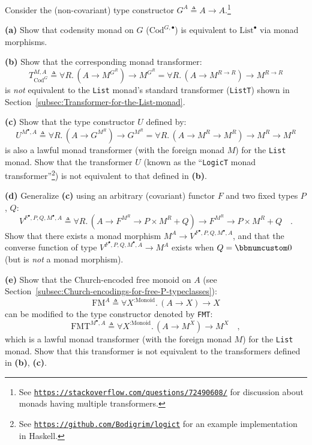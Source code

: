Consider the (non-covariant) type constructor $G^{A}\triangleq A\rightarrow A$.\footnote{See \texttt{\href{https://stackoverflow.com/questions/72490608/}{https://stackoverflow.com/questions/72490608/}}
for discussion about monads having multiple transformers.}

\textbf{(a)} Show that codensity monad on $G$ ($\text{Cod}^{G,\bullet}$)
is equivalent to $\text{List}^{\bullet}$ via monad morphisms.

\textbf{(b)} Show that the corresponding monad transformer: 
\[
T_{\text{Cod}^{G}}^{M,A}\triangleq\forall R.\,(A\rightarrow M^{G^{R}})\rightarrow M^{G^{R}}=\forall R.\,(A\rightarrow M^{R\rightarrow R})\rightarrow M^{R\rightarrow R}
\]
is \emph{not} equivalent to the \lstinline!List! monad\textsf{'}s standard
transformer (\lstinline!ListT!) shown in Section~\ref{subsec:Transformer-for-the-List-monad}.

\textbf{(c)} Show that the type constructor $U$ defined by:
\[
U^{M^{\bullet},A}\triangleq\forall R.\,(A\rightarrow G^{M^{R}})\rightarrow G^{M^{R}}=\forall R.\,(A\rightarrow M^{R}\rightarrow M^{R})\rightarrow M^{R}\rightarrow M^{R}
\]
is also a lawful monad transformer (with the foreign monad $M$) for
the \lstinline!List! monad. Show that the transformer $U$ (known
as the \textsf{``}\lstinline!LogicT! monad transformer\textsf{''}\footnote{See \texttt{\href{https://github.com/Bodigrim/logict}{https://github.com/Bodigrim/logict}}
for an example implementation in Haskell.}) is not equivalent to that defined in \textbf{(b)}. 

\textbf{(d)} Generalize \textbf{(c)} using an arbitrary (covariant)
functor $F$ and two fixed types $P$, $Q$:
\[
V^{F^{\bullet},P,Q,M^{\bullet},A}\triangleq\forall R.\,(A\rightarrow F^{M^{R}}\rightarrow P\times M^{R}+Q)\rightarrow F^{M^{R}}\rightarrow P\times M^{R}+Q\quad.
\]
Show that there exists a monad morphism $M^{A}\rightarrow V^{F^{\bullet},P,Q,M^{\bullet},A}$,
and that the converse function of type $V^{F^{\bullet},P,Q,M^{\bullet},A}\rightarrow M^{A}$
exists when $Q=\bbnum 0$ (but is \emph{not} a monad morphism).

\textbf{(e)} Show that the Church-encoded free monoid on $A$ (see
Section~\ref{subsec:Church-encodings-for-free-P-typeclasses}):
\[
\text{FM}^{A}\triangleq\forall X^{:\text{Monoid}}.\,(A\rightarrow X)\rightarrow X
\]
can be modified to the type constructor denoted by \lstinline!FMT!:
\[
\text{FMT}^{M^{\bullet},A}\triangleq\forall X^{:\text{Monoid}}.\,(A\rightarrow M^{X})\rightarrow M^{X}\quad,
\]
which is a lawful monad transformer (with the foreign monad $M$)
for the \lstinline!List! monad. Show that this transformer is not
equivalent to the transformers defined in \textbf{(b)}, \textbf{(c)}. 

